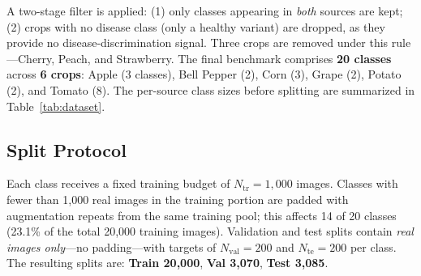 \documentclass[conference]{IEEEtran}
\begin{document}
A two-stage filter is applied: (1) only classes appearing in \textit{both} sources are kept; (2) crops with no disease class (only a healthy variant) are dropped, as they provide no disease-discrimination signal. Three crops are removed under this rule—Cherry, Peach, and Strawberry. The final benchmark comprises \textbf{20 classes} across \textbf{6 crops}: Apple (3 classes), Bell Pepper (2), Corn (3), Grape (2), Potato (2), and Tomato (8). The per-source class sizes before splitting are summarized in Table~\ref{tab:dataset}.

\begin{table}[t]
\caption{Dataset summary: per-source image counts for the 20 retained classes (selected classes shown).}
\label{tab:dataset}
\centering
{}
\end{table}

\subsection{Split Protocol}
Each class receives a fixed training budget of $N_\text{tr}=1{,}000$ images. Classes with fewer than 1{,}000 real images in the training portion are padded with augmentation repeats from the same training pool; this affects 14 of 20 classes (23.1\% of the total 20{,}000 training images). Validation and test splits contain \textit{real images only}—no padding—with targets of $N_\text{val}=200$ and $N_\text{te}=200$ per class. The resulting splits are: \textbf{Train 20{,}000}, \textbf{Val 3{,}070}, \textbf{Test 3{,}085}.
\end{document}
